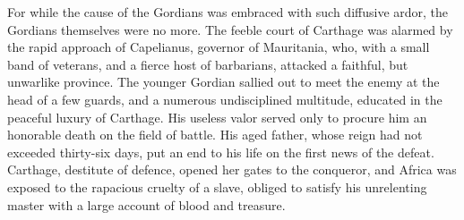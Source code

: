 
For while the cause of the Gordians was embraced with such
diffusive ardor, the Gordians themselves were no more. The feeble
court of Carthage was alarmed by the rapid approach of
Capelianus, governor of Mauritania, who, with a small band of
veterans, and a fierce host of barbarians, attacked a faithful,
but unwarlike province. The younger Gordian sallied out to meet
the enemy at the head of a few guards, and a numerous
undisciplined multitude, educated in the peaceful luxury of
Carthage. His useless valor served only to procure him an
honorable death on the field of battle. His aged father, whose
reign had not exceeded thirty-six days, put an end to his life on
the first news of the defeat. Carthage, destitute of defence,
opened her gates to the conqueror, and Africa was exposed to the
rapacious cruelty of a slave, obliged to satisfy his unrelenting
master with a large account of blood and treasure.\footnotemark[26]


